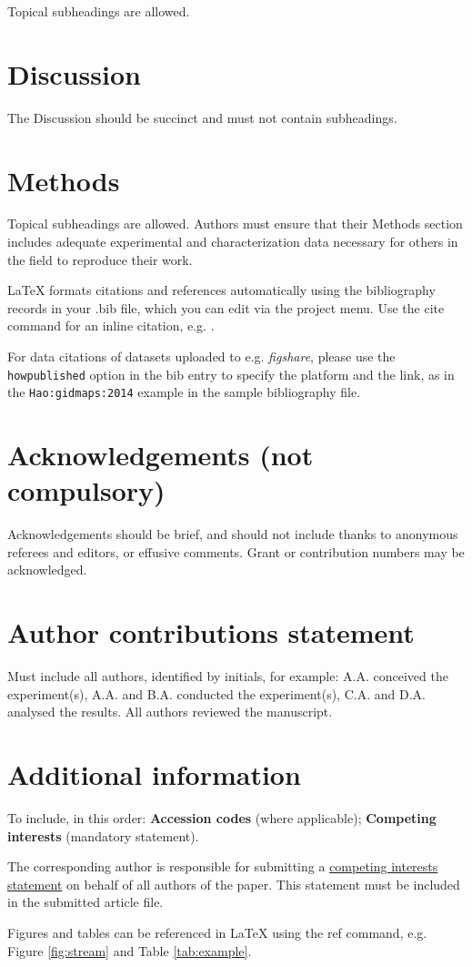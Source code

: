 \documentclass[fleqn,10pt]{wlscirep}
\begin{document}
 
Topical subheadings are allowed.

\section*{Discussion}

The Discussion should be succinct and must not contain subheadings.

\section*{Methods}

Topical subheadings are allowed. Authors must ensure that their Methods section includes adequate experimental and characterization data necessary for others in the field to reproduce their work.



\noindent LaTeX formats citations and references automatically using the bibliography records in your .bib file, which you can edit via the project menu. Use the cite command for an inline citation, e.g.  \cite{Hao:gidmaps:2014}.

For data citations of datasets uploaded to e.g. \emph{figshare}, please use the \verb|howpublished| option in the bib entry to specify the platform and the link, as in the \verb|Hao:gidmaps:2014| example in the sample bibliography file.

\section*{Acknowledgements (not compulsory)}

Acknowledgements should be brief, and should not include thanks to anonymous referees and editors, or effusive comments. Grant or contribution numbers may be acknowledged.

\section*{Author contributions statement}

Must include all authors, identified by initials, for example:
A.A. conceived the experiment(s),  A.A. and B.A. conducted the experiment(s), C.A. and D.A. analysed the results.  All authors reviewed the manuscript. 

\section*{Additional information}

To include, in this order: \textbf{Accession codes} (where applicable); \textbf{Competing interests} (mandatory statement). 

The corresponding author is responsible for submitting a \href{http://www.nature.com/srep/policies/index.html#competing}{competing interests statement} on behalf of all authors of the paper. This statement must be included in the submitted article file.





Figures and tables can be referenced in LaTeX using the ref command, e.g. Figure \ref{fig:stream} and Table \ref{tab:example}.
\end{document}
